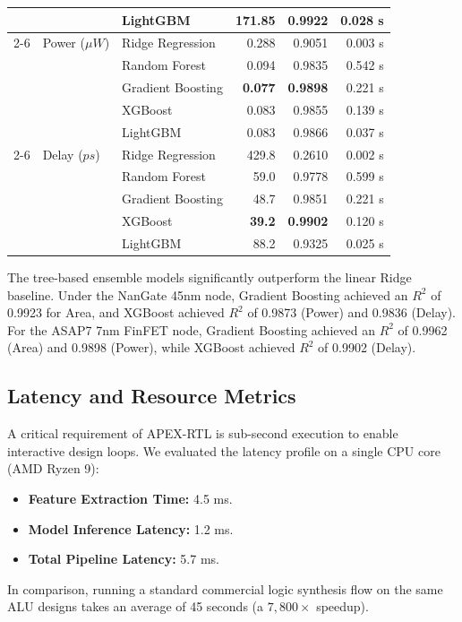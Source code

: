 \documentclass[conference]{IEEEtran}
\begin{document}
\begin{table}[h]
\begin{tabular}{lllrrr}
     &                  & LightGBM & 171.85  & 0.9922 & 0.028 s \\
\cmidrule{2-6}
     & Power ($\mu W$)  & Ridge Regression & 0.288 & 0.9051 & 0.003 s \\
     &                  & Random Forest & 0.094 & 0.9835 & 0.542 s \\
     &                  & Gradient Boosting & \textbf{0.077} & \textbf{0.9898} & 0.221 s \\
     &                  & XGBoost & 0.083 & 0.9855 & 0.139 s \\
     &                  & LightGBM & 0.083 & 0.9866 & 0.037 s \\
\cmidrule{2-6}
     & Delay ($ps$)     & Ridge Regression & 429.8 & 0.2610 & 0.002 s \\
     &                  & Random Forest & 59.0 & 0.9778 & 0.599 s \\
     &                  & Gradient Boosting & 48.7 & 0.9851 & 0.221 s \\
     &                  & XGBoost & \textbf{39.2} & \textbf{0.9902} & 0.120 s \\
     &                  & LightGBM & 88.2 & 0.9325 & 0.025 s \\
\bottomrule
\end{tabular}
\end{table}

The tree-based ensemble models significantly outperform the linear Ridge baseline. Under the NanGate 45nm node, Gradient Boosting achieved an $R^2$ of 0.9923 for Area, and XGBoost achieved $R^2$ of 0.9873 (Power) and 0.9836 (Delay). For the ASAP7 7nm FinFET node, Gradient Boosting achieved an $R^2$ of 0.9962 (Area) and 0.9898 (Power), while XGBoost achieved $R^2$ of 0.9902 (Delay).

\subsection{Latency and Resource Metrics}
A critical requirement of APEX-RTL is sub-second execution to enable interactive design loops. We evaluated the latency profile on a single CPU core (AMD Ryzen 9):
\begin{itemize}
    \item \textbf{Feature Extraction Time:} 4.5 ms.
    \item \textbf{Model Inference Latency:} 1.2 ms.
    \item \textbf{Total Pipeline Latency:} 5.7 ms.
\end{itemize}
In comparison, running a standard commercial logic synthesis flow on the same ALU designs takes an average of 45 seconds (a $7,800\times$ speedup).
\end{document}

